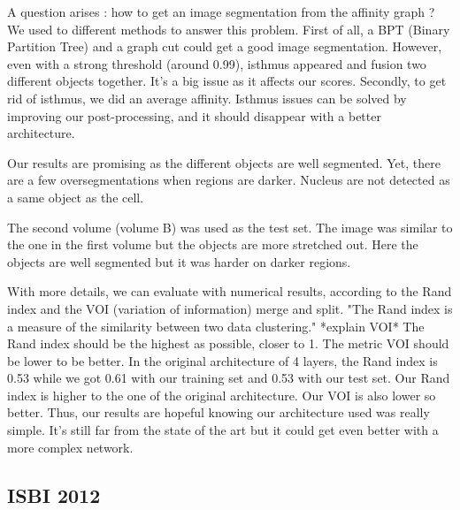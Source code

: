 A question arises : how to get an image segmentation from the affinity graph ?
We used to different methods to answer this problem.
First of all, a BPT (Binary Partition Tree) and a graph cut could get a good image segmentation. 
However, even with a strong threshold (around 0.99), isthmus appeared and fusion two different objects together.
It's a big issue as it affects our scores.
Secondly, to get rid of isthmus, we did an average affinity.
Isthmus issues can be solved by improving our post-processing, and it should disappear with a better architecture.

Our results are promising as the different objects are well segmented. 
Yet, there are a few oversegmentations when regions are darker. 
Nucleus are not detected as a same object as the cell.

The second volume (volume B) was used as the test set.
The image was similar to the one in the first volume but the objects are more stretched out.
Here the objects are well segmented but it was harder on darker regions.

With more details, we can evaluate with numerical results, according to the Rand index and the VOI (variation of information) merge and split. 
"The Rand index is a measure of the similarity between two data clustering."
*explain VOI*
The Rand index should be the highest as possible, closer to 1. 
The metric VOI should be lower to be better.
In the original architecture of 4 layers, the Rand index is 0.53 while we got 0.61 with our training set and 0.53 with our test set.
Our Rand index is higher to the one of the original architecture.
Our VOI is also lower so better.
Thus, our results are hopeful knowing our architecture used was really simple. 
It's still far from the state of the art but it could get even better with a more complex network.

\subsection{ISBI 2012}




